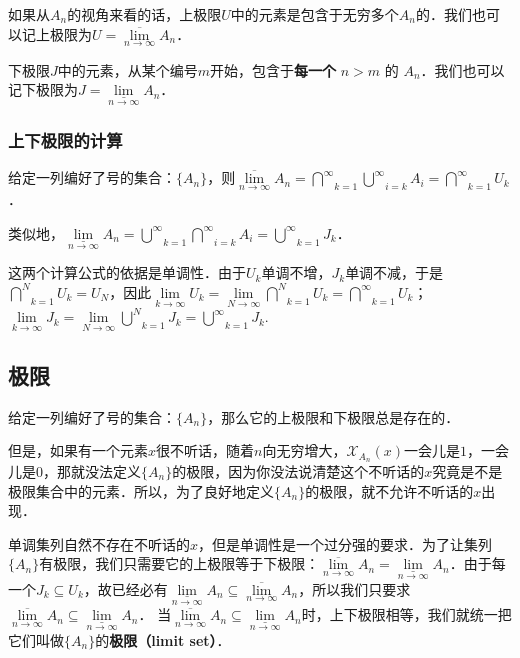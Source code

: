 如果从$A_n$的视角来看的话，上极限$U$中的元素是包含于无穷多个$A_n$的．我们也可以记上极限为$U=\overline{\lim}\limits_{n\rightarrow \infty}A_n$．

下极限$J$中的元素，从某个编号$m$开始，包含于\textbf{每一个} $n>m$ 的 $A_n$．我们也可以记下极限为$J=\underline{\lim}\limits_{n\rightarrow \infty}A_n$．

\subsubsection{上下极限的计算}
给定一列编好了号的集合：$\{A_n\}$，则$\overline{\lim}\limits_{n\rightarrow \infty}A_n=\overset{\infty}\bigcap\limits_{k=1}\overset{\infty}\bigcup\limits_{i=k}A_i=\overset{\infty}\bigcap\limits_{k=1}U_k$．

类似地，$\underline{\lim}\limits_{n\rightarrow \infty}A_n=\overset{\infty}\bigcup\limits_{k=1}\overset{\infty}\bigcap\limits_{i=k}A_i=\overset{\infty}\bigcup\limits_{k=1}J_k$．

这两个计算公式的依据是单调性．由于$U_k$单调不增，$J_k$单调不减，于是$\overset{N}\bigcap\limits_{k=1}U_k=U_N$，因此$\lim\limits_{k\rightarrow\infty}U_k=\lim\limits_{N\rightarrow\infty}\overset{N}\bigcap\limits_{k=1}U_k=\overset{\infty}\bigcap\limits_{k=1}U_k$；$\lim\limits_{k\rightarrow\infty}J_k=\lim\limits_{N\rightarrow\infty}\overset{N}\bigcup\limits_{k=1}J_k=\overset{\infty}\bigcup\limits_{k=1}J_k$.

\subsection{极限}
给定一列编好了号的集合：$\{A_n\}$，那么它的上极限和下极限总是存在的．

但是，如果有一个元素$x$很不听话，随着$n$向无穷增大，$\mathcal{X}_{A_n}(x)$一会儿是$1$，一会儿是$0$，那就没法定义$\{A_n\}$的极限，因为你没法说清楚这个不听话的$x$究竟是不是极限集合中的元素．所以，为了良好地定义$\{A_n\}$的极限，就不允许不听话的$x$出现．

单调集列自然不存在不听话的$x$，但是单调性是一个过分强的要求．为了让集列$\{A_n\}$有极限，我们只需要它的上极限等于下极限：$\overline{\lim}\limits_{n\rightarrow \infty}A_n=\underline{\lim}\limits_{n\rightarrow \infty}A_n$．由于每一个$J_k\subseteq U_k$，故已经必有$\underline{\lim}\limits_{n\rightarrow \infty}A_n\subseteq\overline{\lim}\limits_{n\rightarrow \infty}A_n$，所以我们只要求$\overline{\lim}\limits_{n\rightarrow \infty}A_n\subseteq\underline{\lim}\limits_{n\rightarrow \infty}A_n$．
当$\overline{\lim}\limits_{n\rightarrow \infty}A_n\subseteq\underline{\lim}\limits_{n\rightarrow \infty}A_n$时，上下极限相等，我们就统一把它们叫做$\{A_n\}$的\textbf{极限（limit set）}．
